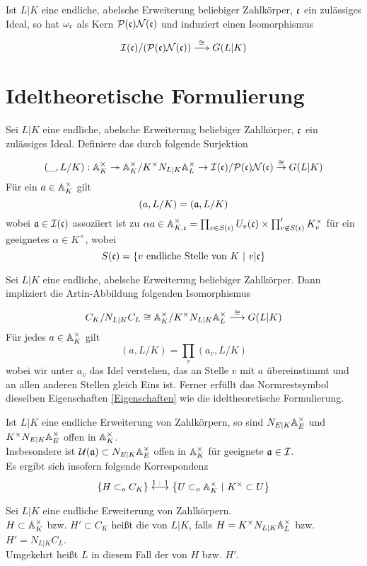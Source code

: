 \Satz{}
Ist $L|K$ eine endliche, abelsche Erweiterung beliebiger Zahlkörper, $\mathfrak{c}$ ein zulässiges Ideal, so hat $\omega_{\mathfrak{c}}$ als Kern $\mathcal{P}(\mathfrak{c})\mathcal{N}(\mathfrak{c})$ und induziert einen Isomorphismus
\[ \mathcal{I}(\mathfrak{c}) / (\mathcal{P}(\mathfrak{c}) \mathcal{N}(\mathfrak{c})) \overset{\overset{}{\cong}}{\longrightarrow} G(L|K) \]

\section{Ideltheoretische Formulierung}
Sei $L|K$ eine endliche, abelsche Erweiterung beliebiger Zahlkörper, $\mathfrak{c}$ ein zulässiges Ideal. Definiere das  durch folgende Surjektion
\[ (\_, L/K) : \mathbb{A}_K^\times \overset{}{\twoheadrightarrow} \mathbb{A}_K^\times / K^\times N_{L|K}\mathbb{A}_L^\times \overset{}{\rightarrow} \mathcal{I}(\mathfrak{c}) /\mathcal{P}(\mathfrak{c}) \mathcal{N}(\mathfrak{c}) \overset{\overset{}{\cong}}{\rightarrow} G(L|K) \]
Für ein $a \in \mathbb{A}_K^\times$ gilt
\[ (a,L/K) = (\mathfrak{a}, L/K) \]
wobei $\mathfrak{a} \in \mathcal{I}(\mathfrak{c})$ assoziiert ist zu $\alpha a \in \mathbb{A}_{K,\mathfrak{c}}^\times = \prod_{v\in S(\mathfrak{c})} U_v(\mathfrak{c}) \times \prod_{v\not \in S(\mathfrak{c})}'K_v^\times $ für ein geeignetes $\alpha \in K^\times$, wobei
\[ S(\cf) = \set{v\text{ endliche Stelle von }K}{ v |\cf } \]

\Satz{}
Sei $L|K$ eine endliche, abelsche Erweiterung beliebiger Zahlkörper. Dann impliziert die Artin-Abbildung folgenden Isomorphismus
\[ C_K /N_{L|K}C_L \overset{}{\cong} \mathbb{A}_K^\times / K^\times N_{L|K}\mathbb{A}_L^\times \overset{\overset{}{\cong}}{\longrightarrow} G(L|K) \]
Für jedes $a \in \mathbb{A}_K^\times$ gilt
\[ (a,L/K) = \prod_v (a_v, L/K) \]
wobei wir unter $a_v$ das Idel verstehen, das an Stelle $v$ mit $a$ übereinstimmt und an allen anderen Stellen gleich Eins ist. Ferner erfüllt das Normrestsymbol dieselben Eigenschaften \ref{Eigenschaften} wie die ideltheoretische Formulierung.

\Bem{}
Ist $L|K$ eine endliche Erweiterung von Zahlkörpern, so sind $N_{E|K}\mathbb{A}_E^\times$ und $K^\times N_{E|K}\mathbb{A}_E^\times$ offen in $\mathbb{A}_K^\times$.\\
Insbesondere ist $\mathcal{U}(\mathfrak{a}) \subset N_{E|K}\mathbb{A}_E^\times$ offen in $\mathbb{A}_K^\times$ für geeignete $\mathfrak{a} \in \mathcal{I}$.\\
Es ergibt sich insofern folgende Korrespondenz
\[ \set{H \subset_o C_K}{} \overset{\text{1 : 1}}\longleftrightarrow \set{U \subset_o \A_K^\times}{K^\times \subset U} \]

Sei $L|K$ eine endliche Erweiterung von Zahlkörpern.\\
$H \subset \mathbb{A}_K^\times$ bzw. $H' \subset C_K$ heißt die  von $L|K$, falls $H = K^\times N_{L|K}\mathbb{A}_L^\times$ bzw. $H' = N_{L|K}C_L$.\\
Umgekehrt heißt $L$ in diesem Fall der  von $H$ bzw. $H'$.

